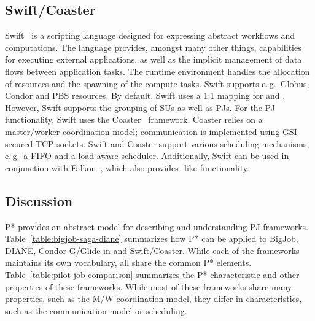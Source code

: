 \documentclass{sig-alternate}
\begin{document}
\subsection{Swift/Coaster}

Swift~\cite{Wilde2011} is a scripting language designed for expressing
abstract workflows and computations. The language provides, amongst many other
things, capabilities for executing external applications, as well as the
implicit management of data flows between application tasks. 
The runtime environment handles the allocation of resources and the spawning of 
the compute tasks. 
Swift supports e.\,g.\ Globus, Condor and PBS resources. 
By default, Swift uses a 1:1 mapping for \cus and \sus. However,
Swift supports the grouping of SUs as well as PJs. For the PJ functionality, Swift uses the
Coaster~\cite{coasters} framework. Coaster relies on a master/worker
coordination model; communication is implemented using GSI-secured TCP sockets.
Swift and Coaster support various scheduling mechanisms, e.\,g.\ a FIFO and a
load-aware scheduler. Additionally, Swift can be used in conjunction with 
Falkon~\cite{1362680}, which also provides \pilot-like functionality.


\subsection{Discussion}


P* provides an abstract model for describing and understanding PJ
frameworks. Table~\ref{table:bigjob-saga-diane} summarizes how P* can
be applied to BigJob, DIANE, Condor-G/Glide-in and Swift/Coaster. While each of 
the frameworks maintains its own vocabulary, all share the common P* elements. 
Table~\ref{table:pilot-job-comparison} summarizes the P* characteristic and 
other properties of these frameworks. While most of these frameworks share many 
properties, such as the M/W coordination model, they differ in characteristics, 
such as the communication model or scheduling.
\end{document}
